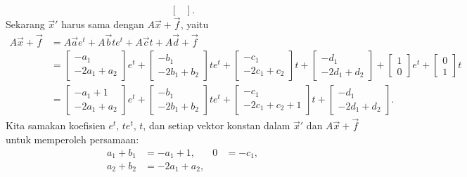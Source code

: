 \begin{example}
\begin{equation*}
\begin{bmatrix}
\end{bmatrix} .
\end{equation*}
Sekarang ${\vec{x}}'$ harus sama dengan $A\vec{x} + \vec{f}$, yaitu
\begin{equation*}
\begin{split}
A \vec{x} + \vec{f} &=
A \vec{a}
e^{t}
+
A \vec{b}
t e^{t}
+
A \vec{c}
t
+
A \vec{d}
+ \vec{f}
\\
& =
\begin{bmatrix}
-a_1 \\ -2a_1+a_2
\end{bmatrix}
e^{t}
+
\begin{bmatrix}
-b_1 \\ -2b_1+b_2
\end{bmatrix}
t e^{t}
+
\begin{bmatrix}
-c_1 \\ -2c_1+c_2
\end{bmatrix}
t
+
\begin{bmatrix}
-d_1 \\ -2d_1+d_2
\end{bmatrix}
+
\begin{bmatrix}
1 \\ 0
\end{bmatrix} 
e^t
+
\begin{bmatrix}
0 \\ 1
\end{bmatrix} 
t 
\\
&=
\begin{bmatrix}
-a_1+1 \\ -2a_1+a_2
\end{bmatrix}
e^{t}
+
\begin{bmatrix}
-b_1 \\ -2b_1+b_2
\end{bmatrix}
t e^{t}
+
\begin{bmatrix}
-c_1 \\ -2c_1+c_2+1
\end{bmatrix}
t
+
\begin{bmatrix}
-d_1 \\ -2d_1+d_2
\end{bmatrix} .
\end{split}
\end{equation*}
Kita samakan koefisien $e^t$, $te^t$, $t$, dan setiap vektor
konstan dalam $\vec{x}'$ dan $A\vec{x}+\vec{f}$ untuk memperoleh persamaan:
\begin{align*}
a_1+b_1 & = -a_1+1 , &
0 & = -c_1 , \\
a_2+b_2 & = -2a_1+a_2 , &

\end{align*}
\end{example}
